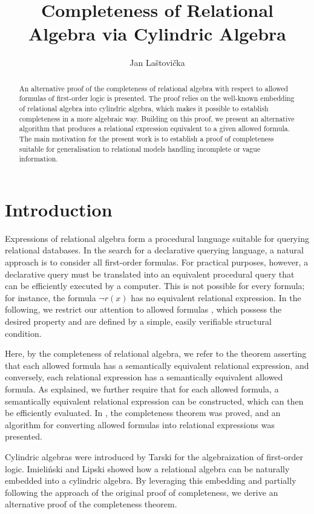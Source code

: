 \documentclass{lmcs}
\title{Completeness of Relational Algebra via Cylindric Algebra}
\author{Jan Laštovička \lmcsorcid{0000-0002-0403-9709}}
\begin{document}
\begin{abstract}
An alternative proof of the completeness of relational algebra with respect to allowed formulas of first-order logic is presented. The proof relies on the well-known embedding of relational algebra into cylindric algebra, which makes it possible to establish completeness in a more algebraic way. Building on this proof, we present an alternative algorithm that produces a relational expression equivalent to a given allowed formula. The main motivation for the present work is to establish a proof of completeness suitable for generalisation to relational models handling incomplete or vague information.
\end{abstract}

\maketitle
\section{Introduction}
Expressions of relational algebra \cite{Codd1970} form a procedural language suitable for querying relational databases. In the search for a declarative querying language, a natural approach is to consider all first-order formulas. For practical purposes, however, a declarative query must be translated into an equivalent procedural query that can be efficiently executed by a computer. This is not possible for every formula; for instance, the formula $\neg r(x)$ has no equivalent relational expression. In the following, we restrict our attention to allowed formulas \cite{Topor1987, GelderTopoer:safety}, which possess the desired property and are defined by a simple, easily verifiable structural condition.

Here, by the completeness of relational algebra, we refer to the theorem asserting that each allowed formula has a semantically equivalent relational expression, and conversely, each relational expression has a semantically equivalent allowed formula. As explained, we further require that for each allowed formula, a semantically equivalent relational expression can be constructed, which can then be efficiently evaluated. In \cite{GelderTopoer:safety}, the completeness theorem was proved, and an algorithm for converting allowed formulas into relational expressions was presented.

Cylindric algebras  \cite{HMT1971,HMTAN1981} were introduced by Tarski for the algebraization of first-order logic. Imieliński and Lipski \cite{ImLi1982} showed how a relational algebra can be naturally embedded into a cylindric algebra. By leveraging this embedding and partially following the approach of the original proof of completeness, we derive an alternative proof of the completeness theorem. 
\end{document}
